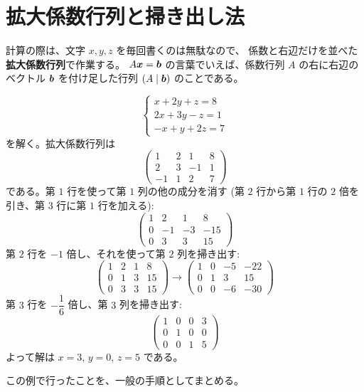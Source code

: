 \section{拡大係数行列と掃き出し法}

計算の際は、文字 $x, y, z$ を毎回書くのは無駄なので、
係数と右辺だけを並べた\textbf{拡大係数行列}で作業する。
$A\bm{x} = \bm{b}$ の言葉でいえば、係数行列 $A$ の右に右辺のベクトル
$\bm{b}$ を付け足した行列 $(A \mid \bm{b})$ のことである。

\begin{rei}[掃き出し法の実行]\label{rei:gauss-demo}
\[
\begin{cases}
x + 2y + z = 8 \\
2x + 3y - z = 1 \\
-x + y + 2z = 7
\end{cases}
\]
を解く。拡大係数行列は
\[
\left(\begin{array}{ccc|c}
1 & 2 & 1 & 8 \\
2 & 3 & -1 & 1 \\
-1 & 1 & 2 & 7
\end{array}\right)
\]
である。第 $1$ 行を使って第 $1$ 列の他の成分を消す
(第 $2$ 行から第 $1$ 行の $2$ 倍を引き、第 $3$ 行に第 $1$ 行を加える):
\[
\left(\begin{array}{ccc|c}
1 & 2 & 1 & 8 \\
0 & -1 & -3 & -15 \\
0 & 3 & 3 & 15
\end{array}\right)
\]
第 $2$ 行を $-1$ 倍し、それを使って第 $2$ 列を掃き出す:
\[
\left(\begin{array}{ccc|c}
1 & 2 & 1 & 8 \\
0 & 1 & 3 & 15 \\
0 & 3 & 3 & 15
\end{array}\right)
\longrightarrow
\left(\begin{array}{ccc|c}
1 & 0 & -5 & -22 \\
0 & 1 & 3 & 15 \\
0 & 0 & -6 & -30
\end{array}\right)
\]
第 $3$ 行を $-\dfrac{1}{6}$ 倍し、第 $3$ 列を掃き出す:
\[
\left(\begin{array}{ccc|c}
1 & 0 & 0 & 3 \\
0 & 1 & 0 & 0 \\
0 & 0 & 1 & 5
\end{array}\right)
\]
よって解は $x = 3$, $y = 0$, $z = 5$ である。
\end{rei}

この例で行ったことを、一般の手順としてまとめる。

